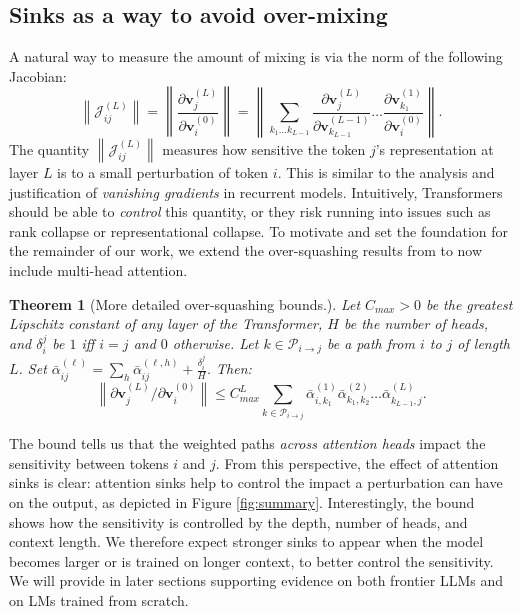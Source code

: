 \documentclass{article} %
\newtheorem{theorem}{Theorem}[section]
\newcommand{\vb}{\mathbf{v}}
\newcommand{\J}{\mathcal{J}}
\begin{document}
\subsection{Sinks as a way to avoid over-mixing}
A natural way to measure the amount of mixing is via the norm of the following Jacobian:
\begin{equation}
    \left \lVert \J_{ij}^{(L)} \right \rVert = \left \lVert \frac{\partial \vb^{(L)}_j}{\partial \vb^{(0)}_i}  \right \rVert = \left \lVert \sum_{k_1 ... k_{L-1}} \frac{\partial \vb^{(L)}_j}{\partial \vb^{(L-1)}_{k_{L-1}}} \dots \frac{\partial \vb^{(1)}_{k_1}}{\partial \vb^{(0)}_{i}} \right \rVert.
\end{equation}
The quantity $\left \lVert\J_{ij}^{(L)}\right \rVert$ measures how sensitive the token $j$'s representation at layer $L$ is to a small perturbation of token $i$. This is similar to the analysis and justification of \emph{vanishing gradients} in recurrent models. Intuitively, Transformers should be able to \emph{control} this quantity, or they risk running into issues such as rank collapse or representational collapse. To motivate and set the foundation for the remainder of our work, we extend the over-squashing results from \cite{barbero2024transformers} to now include multi-head attention. 

\begin{theorem}[More detailed over-squashing bounds.] Let $C_{max} > 0$ be the greatest Lipschitz constant of any layer of the Transformer, $H$ be the number of heads, and $\delta_i^j$ be $1$ iff $i=j$ and $0$ otherwise. Let $k \in \mathcal{P}_{i \to j}$ be a path from $i$ to $j$ of length $L$. Set $\bar{\alpha}_{ij}^{(\ell)} = \sum_{h} \bar{\alpha}_{ij}^{(\ell, h)} + \frac{\delta_i^j}{H}$. Then: 
\begin{equation}
    \left \lVert \partial \vb^{(L)}_j / \partial \vb^{(0)}_i \right \rVert \leq C^L_{max} \sum_{k \in \mathcal{P}_{i \to j}}  \bar{\alpha}^{(1)}_{i, k_1} \bar{\alpha}^{(2)}_{k_1, k_2} \dots \bar{\alpha}^{(L)}_{k_{L-1}, j}.
\end{equation}    
\end{theorem}

The bound tells us that the weighted paths \emph{across attention heads} impact the sensitivity between tokens $i$ and $j$. From this perspective, the effect of attention sinks is clear: attention sinks help to control the impact a perturbation can have on the output, as depicted in Figure \ref{fig:summary}. Interestingly, the bound shows how the sensitivity is controlled by the depth, number of heads, and context length. We therefore expect stronger sinks to appear when the model becomes larger or is trained on longer context, to better control the sensitivity. We will provide in later sections supporting evidence on both frontier LLMs and on LMs trained from scratch.
\end{document}

